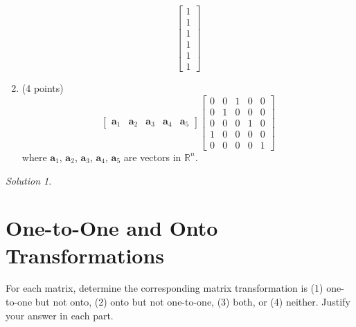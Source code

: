 \documentclass{article}
\theoremstyle{remark}
\newtheorem*{solution}{Solution}
\begin{document}
\begin{enumerate}
\begin{displaymath}
    \begin{bmatrix}
      1 \\ 1 \\ 1 \\ 1 \\ 1 \\ 1
    \end{bmatrix}
  \end{displaymath}
\item (4 points)
  \begin{displaymath}
    \begin{bmatrix}
      \mathbf a_1 & \mathbf a_2 & \mathbf a_3 & \mathbf a_4 & \mathbf a_5
    \end{bmatrix}
    \begin{bmatrix}
      0 & 0 & 1 & 0 & 0 \\
      0 & 1 & 0 & 0 & 0 \\
      0 & 0 & 0 & 1 & 0 \\
      1 & 0 & 0 & 0 & 0 \\
      0 & 0 & 0 & 0 & 1
    \end{bmatrix}
  \end{displaymath}
  where $\mathbf a_1$, $\mathbf a_2$, $\mathbf a_3$, $\mathbf a_4$, $\mathbf a_5$ are vectors in $\mathbb R^n$.
\end{enumerate}
\medskip

\begin{solution}
\end{solution}

\pagebreak
\section{One-to-One and Onto Transformations}

For each matrix, determine the corresponding matrix transformation is (1) one-to-one but not onto, (2) onto but not one-to-one, (3) both, or (4) neither. Justify your answer in each part.
\end{document}
